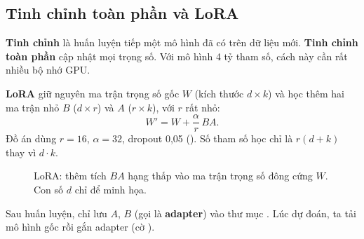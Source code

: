 \subsection{Tinh chỉnh toàn phần và LoRA}
\label{sec:lora}

\textbf{Tinh chỉnh}  là huấn luyện tiếp một mô hình đã có trên dữ liệu mới.
\textbf{Tinh chỉnh toàn phần}  cập nhật mọi trọng số. Với mô hình 4 tỷ tham số, cách này cần rất nhiều bộ nhớ GPU.

\textbf{LoRA}  giữ nguyên ma trận trọng số gốc $W$ (kích thước $d \times k$) và học thêm
hai ma trận nhỏ $B$ ($d \times r$) và $A$ ($r \times k$), với $r$ rất nhỏ:
\[
  W' = W + \frac{\alpha}{r}\, B A .
\]
Đồ án dùng $r = 16$, $\alpha = 32$, dropout 0,05 (). Số tham số học chỉ là $r(d+k)$ thay vì $d \cdot k$.

\begin{figure}[H]
\centering
{}
\caption{LoRA: thêm tích $BA$ hạng thấp vào ma trận trọng số đông cứng $W$. Con số $d$ chỉ để minh họa.}
\label{fig:lora}
\end{figure}

Sau huấn luyện, chỉ lưu $A$, $B$ (gọi là \textbf{adapter}) vào thư mục . Lúc dự đoán, ta tải mô hình gốc rồi
gắn adapter (cờ ).

